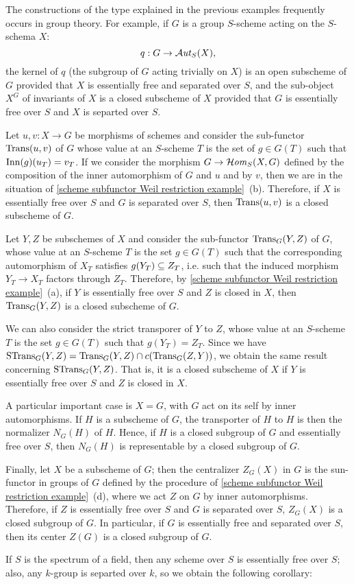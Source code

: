 The constructions of the type explained in the previous examples frequently occurs in group theory. For example, if $G$ is a group $S$-scheme acting on the $S$-schema $X$:
\[q:G\to\operatorname{\mathcal{A}\hspace*{-0.2pt}\textit{ut}\hspace{0.5pt}}_S(X),\]
the kernel of $q$ (the subgroup of $G$ acting trivially on $X$) is an open subscheme of $G$ provided that $X$ is essentially free and separated over $S$, and the sub-object $X^G$ of invariants of $X$ is a closed subscheme of $X$ provided that $G$ is essentially free over $S$ and $X$ is separted over $S$.\par
Let $u,v:X\to G$ be morphisms of schemes and consider the sub-functor $\mathrm{Trans}(u,v)$ of $G$ whose value at an $S$-scheme $T$ is the set of $g\in G(T)$ such that $\mathrm{Inn}(g)(u_T)=v_T$. If we consider the morphism $G\to\operatorname{\mathcal{H}\hspace*{-0.4pt}\textit{om}\hspace{0.5pt}}_S(X,G)$ defined by the composition of the inner automorphism of $G$ and $u$ and by $v$, then we are in the situation of \cref{scheme subfunctor Weil restriction example}~(b). Therefore, if $X$ is essentially free over $S$ and $G$ is separated over $S$, then $\mathrm{Trans}(u,v)$ is a closed subscheme of $G$.\par
Let $Y,Z$ be subschemes of $X$ and consider the sub-functor $\mathrm{Trans}_G(Y,Z)$ of $G$, whose value at an $S$-scheme $T$ is the set $g\in G(T)$ such that the corresponding automorphism of $X_T$ satisfies $g(Y_T)\subseteq Z_T$, i.e. such that the induced morphism $Y_T\to X_T$ factors through $Z_T$. Therefore, by \cref{scheme subfunctor Weil restriction example}~(a), if $Y$ is essentially free over $S$ and $Z$ is closed in $X$, then $\mathrm{Trans}_G(Y,Z)$ is a closed subscheme of $G$.\par
We can also consider the strict transporer of $Y$ to $Z$, whose value at an $S$-scheme $T$ is the set $g\in G(T)$ such that $g(Y_T)=Z_T$. Since we have $\mathrm{STrans}_G(Y,Z)=\mathrm{Trans}_G(Y,Z)\cap c(\mathrm{Trans}_G(Z,Y))$, we obtain the same result concerning $\mathrm{STrans}_G(Y,Z)$. That is, it is a closed subscheme of $X$ if $Y$ is essentially free over $S$ and $Z$ is closed in $X$.\par
A particular important case is $X=G$, with $G$ act on its self by inner automorphisms. If $H$ is a subscheme of $G$, the transporter of $H$ to $H$ is then the normalizer $N_G(H)$ of $H$. Hence, if $H$ is a closed subgroup of $G$ and essentially free over $S$, then $N_G(H)$ is representable by a closed subgroup of $G$.\par
Finally, let $X$ be a subscheme of $G$; then the centralizer $Z_G(X)$ in $G$ is the sun-functor in groups of $G$ defined by the procedure of \cref{scheme subfunctor Weil restriction example}~(d), where we act $Z$ on $G$ by inner automorphisms. Therefore, if $Z$ is essentially free over $S$ and $G$ is separated over $S$, $Z_G(X)$ is a closed subgroup of $G$. In particular, if $G$ is essentially free and separated over $S$, then its center $Z(G)$ is a closed subgroup of $G$.\par
If $S$ is the spectrum of a field, then any scheme over $S$ is essentially free over $S$; also, any $k$-group is separted over $k$, so we obtain the following corollary:

